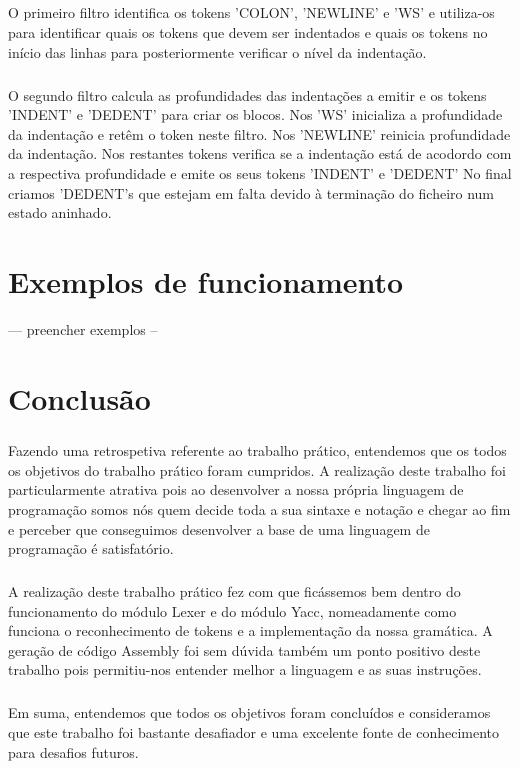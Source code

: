 \documentclass[11pt,a4paper]{report}
\begin{document}
    \paragraph{}
    O primeiro filtro identifica os tokens 'COLON', 'NEWLINE' e 'WS' e utiliza-os para identificar quais os tokens que devem ser indentados e 
    quais os tokens no início das linhas para posteriormente verificar o nível da indentação.
    \paragraph{}
    O segundo filtro calcula as profundidades das indentações a emitir e os tokens 'INDENT' e 'DEDENT' para criar os blocos.
    Nos 'WS' inicializa a profundidade da indentação e retêm o token neste filtro. Nos 'NEWLINE' reinicia profundidade da indentação.
    Nos restantes tokens verifica se a indentação está de acodordo com a respectiva profundidade e emite os seus tokens 'INDENT' e 'DEDENT'
    No final criamos 'DEDENT's que estejam em falta devido à terminação do ficheiro num estado aninhado.



    \chapter{Exemplos de funcionamento}
    --- preencher exemplos -- 


\chapter{Conclusão}
\paragraph{}
Fazendo uma retrospetiva referente ao trabalho prático, entendemos que os todos os objetivos do trabalho prático foram cumpridos. A realização deste trabalho foi particularmente atrativa pois ao desenvolver a nossa própria linguagem de programação somos nós quem decide toda a sua sintaxe e notação e chegar ao fim e perceber que conseguimos desenvolver a base de uma linguagem de programação é satisfatório.
\paragraph{}
A realização deste trabalho prático fez com que ficássemos bem dentro do funcionamento do módulo Lexer e do módulo Yacc, nomeadamente como funciona o reconhecimento de tokens e a implementação da nossa gramática. A geração de código Assembly foi sem dúvida também um ponto positivo deste trabalho pois permitiu-nos entender melhor a linguagem e as suas instruções. 
\paragraph{}
Em suma, entendemos que todos os objetivos foram concluídos e consideramos que este trabalho foi bastante desafiador e uma excelente fonte de conhecimento para desafios futuros. 
\end{document}
